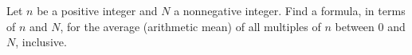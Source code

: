 Let $n$ be a positive integer and $N$ a nonnegative integer. Find a formula, in terms of $n$ and $N$, for the average (arithmetic mean) of all multiples of $n$ between $0$ and $N$, inclusive.
